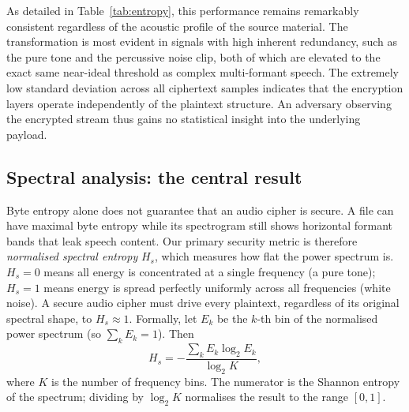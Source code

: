 \documentclass[pdflatex,sn-mathphys-num]{sn-jnl}%
\theoremstyle{thmstyleone}%
\theoremstyle{thmstyletwo}%
\theoremstyle{thmstylethree}%
\begin{document}
As detailed in Table~\ref{tab:entropy}, this performance remains remarkably consistent regardless of the acoustic profile of the source material. The transformation is most evident in signals with high inherent redundancy, such as the pure tone and the percussive noise clip, both of which are elevated to the exact same near-ideal threshold as complex multi-formant speech. The extremely low standard deviation across all ciphertext samples indicates that the encryption layers operate independently of the plaintext structure. An adversary observing the encrypted stream thus gains no statistical insight into the underlying payload.

\subsection{Spectral analysis: the central result}
\label{sec:spectral}

Byte entropy alone does not guarantee that an audio cipher is secure. A file can have maximal byte entropy while its spectrogram still shows horizontal formant bands that leak speech content. Our primary security metric is therefore \emph{normalised spectral entropy} $H_s$, which measures how flat the power spectrum is. $H_s=0$ means all energy is concentrated at a single frequency (a pure tone); $H_s=1$ means energy is spread perfectly uniformly across all frequencies (white noise). A secure audio cipher must drive every plaintext, regardless of its original spectral shape, to $H_s\approx1$.
Formally, let $E_k$ be the $k$-th bin of the normalised power spectrum (so $\sum_k E_k = 1$). Then
\begin{equation}
H_s = -\frac{\sum_{k} E_k \log_2 E_k}{\log_2 K},
\label{eq:hs}
\end{equation}
where $K$ is the number of frequency bins. The numerator is the Shannon entropy of the spectrum; dividing by $\log_2 K$ normalises the result to the range $[0,1]$.
\end{document}
